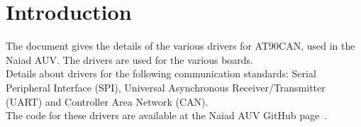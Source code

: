 
\section{Introduction}\label{sec:introduction}
The document gives the details of the various drivers for AT90CAN, used in the Naiad AUV. The drivers are used for the various boards. \\
Details about drivers for the following communication standards: Serial Peripheral Interface (SPI), Universal Asynchronous Receiver/Transmitter (UART) and Controller Area Network (CAN). \\
The code for these drivers are available at the Naiad AUV GitHub page~\cite{web:naiad_git}.
